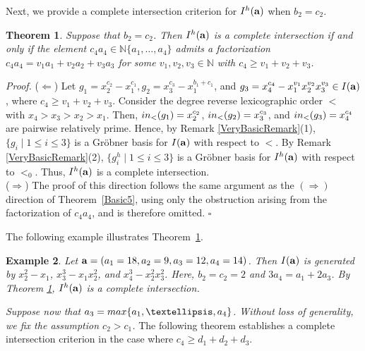 \documentclass[10pt,a4paper]{amsart}
\newtheorem{thm1}{Theorem}[section]
\newtheorem{ex1}[thm1]{Example}
\begin{document}
Next, we provide a complete intersection criterion for $I^{h}({\bf a})$ when $b_2=c_2$.

\begin{thm1} \label{Basic23} Suppose that $b_2=c_2$. Then $I^{h}({\bf a})$ is a complete intersection if and only if the element $c_{4}a_{4} \in \mathbb{N}\{a_1,\ldots,a_4\}$ admits a factorization $c_{4}a_{4}=v_{1}a_{1}+v_{2}a_{2}+v_{3}a_{3}$ for some $v_1, v_2, v_3 \in \mathbb{N}$ with $c_{4} \geq v_1+v_{2}+v_{3}$. 
\end{thm1}


{\em \noindent Proof.} ($\Leftarrow$) Let $g_{1}=x_{2}^{c_2}-x_{1}^{c_1}, g_{2}=x_{3}^{c_3}-x_{1}^{b_1+c_1}$, and $g_{3}=x_{4}^{c_4}-x_{1}^{v_1}x_{2}^{v_2}x_{3}^{v_3} \in I({\bf a})$, where $c_{4} \geq v_1+v_{2}+v_{3}$. Consider the degree reverse lexicographic order $<$ with $x_{4}>x_{3}>x_{2}>x_{1}$. Then, ${\rm in}_{<}(g_1)=x_{2}^{c_2}$, ${\rm in}_{<}(g_2)=x_{3}^{c_3}$, and ${\rm in}_{<}(g_3)=x_{4}^{c_4}$ are pairwise relatively prime. Hence, by Remark \ref{VeryBasicRemark}(1), $\{g_{i} \mid 1 \leq i \leq 3\}$ is a Gr\"obner basis for $I({\bf a})$ with respect to $<$. By Remark \ref{VeryBasicRemark}(2), $\{g_{i}^{h} \mid 1 \leq i \leq 3\}$ is a Gr\"obner basis for $I^{h}({\bf a})$ with respect to $<_{0}$. Thus, $I^{h}({\bf a})$ is a complete intersection.\\ ($\Rightarrow$) The proof of this direction follows the same argument as the $(\Rightarrow)$ direction of Theorem~\ref{Basic5}, using only the obstruction arising from the factorization of $c_4a_4$, and is therefore omitted. \hfill $\square$ \par\vspace{0.5\baselineskip}

The following example illustrates Theorem~\ref{Basic23}.


\begin{ex1} {\rm Let ${\bf a}=(a_{1}=18, a_{2}=9, a_{3}=12, a_{4}=14)$. Then $I({\bf a})$ is generated by $x_{2}^{2}-x_{1}$, $x_{3}^{3}-x_{1}x_{2}^{2}$, and $x_{4}^{3}-x_{2}^2x_{3}^{2}$. Here, $b_{2}=c_{2}=2$ and $3a_4=a_1+2a_3$. By Theorem \ref{Basic23}, $I^{h}({\bf a})$ is a complete intersection.} 
\end{ex1}

{\em Suppose now that $a_{3}={\rm max}\{a_1,\ldots,a_4\}$. Without loss of generality, we fix the assumption $c_{2}>c_{1}$.} The following theorem establishes a complete intersection criterion in the case where $c_4 \geq d_1+d_2+d_3$.
\end{document}
